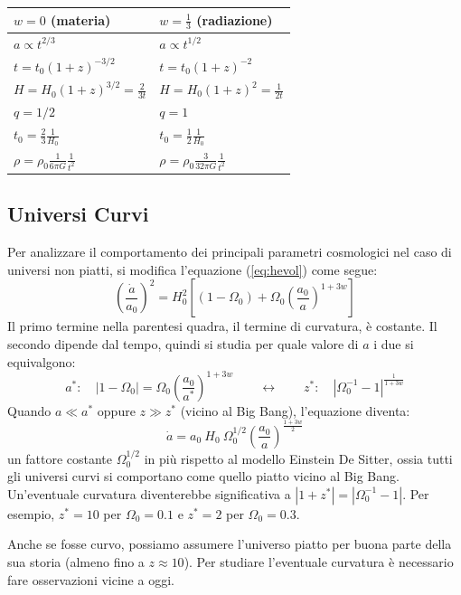 \begin{table}[h]
\centering
\def\arraystretch{1.5}
\begin{tabular}{@{}ll@{}}
\toprule
\textbf{$w=0$ (materia)} & \textbf{$w=\frac{1}{3}$ (radiazione)} \\ \midrule
$a\propto t^{2/3}$ & $a\propto t^{1/2}$ \\
$t = t_0 \left ( 1+z \right )^{-3/2}$ & $t = t_0 \left ( 1+z \right )^{-2}$ \\
$H = H_0 (1+z)^{3/2} = \frac{2}{3t} $ & $H = H_0 (1+z)^{2} = \frac{1}{2t}$ \\
$q =1/2 $ & $q = 1$ \\
$t_0 = \frac{2}{3}\frac{1}{H_0}$ & $t_0 = \frac{1}{2}\frac{1}{H_0}$ \\
$\rho  = \rho_0 \frac{1}{6\pi G}\frac{1}{t^2}$ & $\rho  =  \rho_0 \frac{3}{32\pi G}\frac{1}{t^2}$ \\ \bottomrule
\end{tabular}
\end{table}

\subsection{Universi Curvi}
Per analizzare il comportamento dei principali parametri cosmologici nel caso di universi non piatti, si modifica l'equazione (\ref{eq:hevol}) come segue:
$$
\left ( \frac{\dot{a}}{a_0} \right )^2 = H_0^2 \left [ (1-\Omega_0 ) + \Omega_0 \left ( \frac{a_0}{a} \right )^{1+3w} \right ]
$$
Il primo termine nella parentesi quadra, il termine di curvatura, è costante. Il secondo dipende dal tempo, quindi si studia per quale valore di $a$ i due si equivalgono:
$$
a^*:\quad \left | 1-\Omega_0  \right | = \Omega_0\left ( \frac{a_0}{a^*} \right )^{1+3w}\qquad \leftrightarrow \qquad z^*:\quad \left | \Omega_0^{-1} - 1  \right |^{\frac{1}{1+3w}}
$$
Quando $a\ll a^*$ oppure $z\gg z^*$ (vicino al Big Bang), l'equazione diventa:
$$
\dot{a}=a_0~ H_0 ~\Omega_0^{1/2} \left ( \frac{a_0}{a}\right )^{\frac{1+3w}{2}}
$$
un fattore costante $\Omega_0^{1/2}$ in più rispetto al modello Einstein De Sitter, ossia tutti gli universi curvi si comportano come quello piatto vicino al Big Bang. Un'eventuale curvatura diventerebbe significativa a  $\left |  1+z^* \right | =  \left | \Omega_0^{-1} - 1  \right |$. Per esempio, $z^* =10$ per $\Omega_0=0.1$ e $z^* = 2$ per $\Omega_0=0.3$.

\begin{theorem}[Messaggio]
Anche se fosse curvo, possiamo assumere l'universo piatto per buona parte della sua storia (almeno fino a $z\approx 10$). Per studiare l'eventuale curvatura è necessario fare osservazioni vicine a oggi.
\end{theorem}

